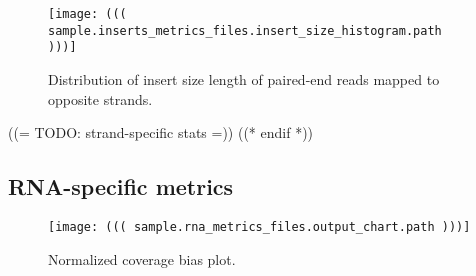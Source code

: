 {
    \begin{figure}[h!]
        \centering
        \texttt{[image: ((( sample.inserts\_metrics\_files.insert\_size\_histogram.path )))]}
        \caption{Distribution of insert size length of paired-end reads mapped to opposite strands.}
    \end{figure}
}
((= TODO: strand-specific stats
=))
((* endif *))


\subsection{RNA-specific metrics}

{
    \begin{figure}[h!]
        \centering
        \texttt{[image: ((( sample.rna\_metrics\_files.output\_chart.path )))]}
        \caption{Normalized coverage bias plot.}
    \end{figure}
}

